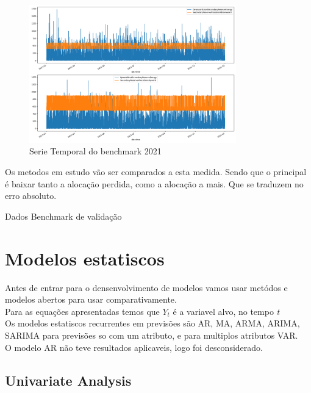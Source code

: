 \begin{figure}[H]
    \centering
    \includegraphics[width=0.8\textwidth]{../plots/benchmark_validation.png}
    \caption{Serie Temporal do benchmark 2021}
    \label{fig:benchmark_validation}
\end{figure}
  

Os metodos em estudo vão ser comparados a esta medida. Sendo que o principal é baixar tanto a alocação perdida, como a alocação a mais. Que se traduzem no erro absoluto.\\

\begin{table}[H]
    \caption{Dados Benchmark de validação}
\end{table}

\section{Modelos estatiscos\label{se:model_stats}}

Antes de entrar para o densenvolvimento de modelos vamos usar metódos e modelos abertos para usar comparativamente.\\
Para as equações apresentadas temos que \textit{$Y_t$} é a variavel alvo, no tempo \textit{t} \\


Os modelos estatiscos recurrentes em previsões são AR, MA, ARMA, ARIMA, SARIMA para previsões so com um atributo, e para multiplos atributos VAR.\\
O modelo AR não teve resultados aplicaveis, logo foi desconsiderado.\\

\subsection{Univariate Analysis}

